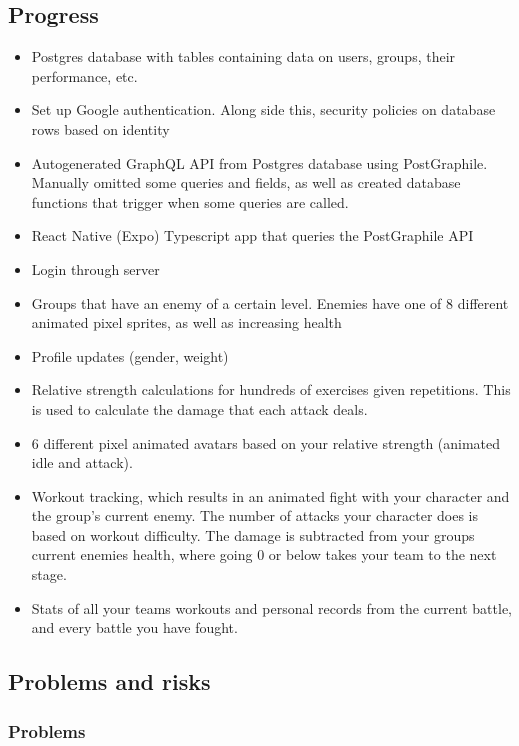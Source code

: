 \documentclass[11pt]{article}
\begin{document}
\subsection{Progress}\label{progress}
\begin{itemize}
\item Postgres database with tables containing data on users, groups, their performance, etc.
\item Set up Google authentication. Along side this, security policies on database rows based on identity 
\item Autogenerated GraphQL API from Postgres database using PostGraphile. Manually omitted some queries and fields, as well as created database functions that trigger when some queries are called. 
\item React Native (Expo) Typescript app that queries the PostGraphile API
\item Login through server
\item Groups that have an enemy of a certain level. Enemies have one of 8 different animated pixel sprites, as well as increasing health
\item Profile updates (gender, weight)
\item Relative strength calculations for hundreds of exercises given repetitions. This is used to calculate the damage that each attack deals.
\item 6 different pixel animated avatars based on your relative strength (animated idle and attack).
\item Workout tracking, which results in an animated fight with your character and the group's current enemy. The number of attacks your character does is based on workout difficulty. The damage is subtracted from your groups current enemies health, where going 0 or below takes your team to the next stage. 
\item Stats of all your teams workouts and personal records from the current battle, and every battle you have fought.
\end{itemize}
\subsection{Problems and risks}\label{problems-and-risks}

\subsubsection{Problems}\label{problems}
\end{document}
